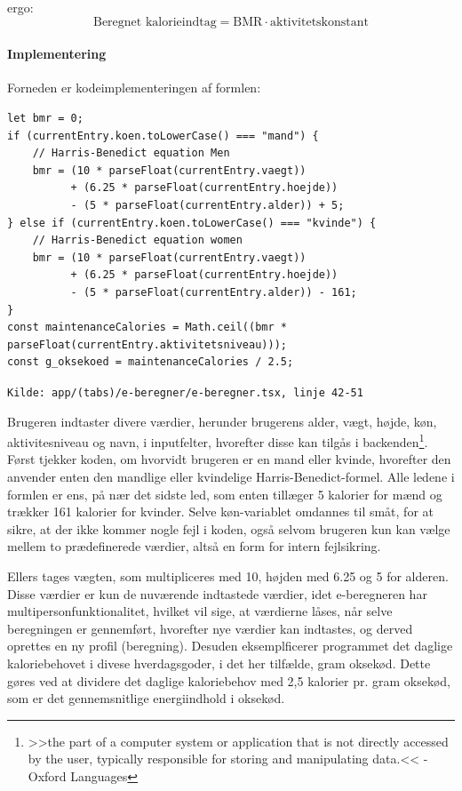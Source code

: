 ergo:
\begin{equation*}
    \text{Beregnet kalorieindtag} = \text{BMR} \cdot \text{aktivitetskonstant}
\end{equation*}

\paragraph{Implementering}
Forneden er kodeimplementeringen af formlen: 
\begin{mdframed}[backgroundcolor=blue!5]
\begin{verbatim}
let bmr = 0;
if (currentEntry.koen.toLowerCase() === "mand") {
    // Harris-Benedict equation Men
    bmr = (10 * parseFloat(currentEntry.vaegt)) 
          + (6.25 * parseFloat(currentEntry.hoejde)) 
          - (5 * parseFloat(currentEntry.alder)) + 5;
} else if (currentEntry.koen.toLowerCase() === "kvinde") {
    // Harris-Benedict equation women
    bmr = (10 * parseFloat(currentEntry.vaegt)) 
          + (6.25 * parseFloat(currentEntry.hoejde)) 
          - (5 * parseFloat(currentEntry.alder)) - 161;
}
const maintenanceCalories = Math.ceil((bmr * parseFloat(currentEntry.aktivitetsniveau)));
const g_oksekoed = maintenanceCalories / 2.5;
\end{verbatim}
\end{mdframed}
\footnotesize\texttt{Kilde: app/(tabs)/e-beregner/e-beregner.tsx, linje 42-51}

Brugeren indtaster divere værdier, herunder brugerens alder, vægt, højde, køn, aktivitesniveau og navn, i inputfelter, hvorefter disse kan tilgås i backenden\footnote{>>the part of a computer system or application that is not directly accessed by the user, typically responsible for storing and manipulating data.<< - Oxford Languages}. Først tjekker koden, om hvorvidt brugeren er en mand eller kvinde, hvorefter den anvender enten den mandlige eller kvindelige Harris-Benedict-formel. Alle ledene i formlen er ens, på nær det sidste led, som enten tillæger 5 kalorier for mænd og trækker 161 kalorier for kvinder. Selve køn-variablet omdannes til småt, for at sikre, at der ikke kommer nogle fejl i koden, også selvom brugeren kun kan vælge mellem to prædefinerede værdier, altså en form for intern fejlsikring.

Ellers tages vægten, som multipliceres med 10, højden med 6.25 og 5 for alderen. Disse værdier er kun de nuværende indtastede værdier, idet e-beregneren har multipersonfunktionalitet, hvilket vil sige, at værdierne låses, når selve beregningen er gennemført, hvorefter nye værdier kan indtastes, og derved oprettes en ny profil (beregning). Desuden eksemplficerer programmet det daglige kaloriebehovet i divese hverdagsgoder, i det her tilfælde, gram oksekød. Dette gøres ved at dividere det daglige kaloriebehov med 2,5 kalorier pr. gram oksekød, som er det gennemsnitlige energiindhold i oksekød.

